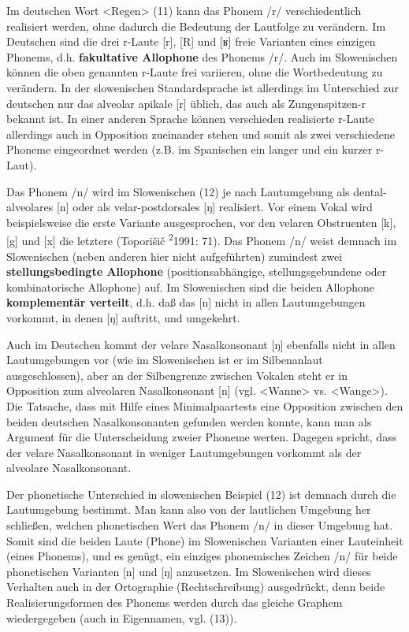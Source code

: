\documentclass[
]{article}
\begin{document}
Im deutschen Wort \textless Regen\textgreater{} (11) kann das Phonem /r/ verschiedentlich
realisiert werden, ohne dadurch die Bedeutung der Lautfolge zu
verändern. Im Deutschen sind die drei r-Laute {[}r{]}, {[}R{]} und {[}ʁ{]} freie
Varianten eines einzigen Phonems, d.h. \textbf{fakultative Allophone} des
Phonems /r/. Auch im Slowenischen können die oben genannten r-Laute frei
variieren, ohne die Wortbedeutung zu verändern. In der slowenischen
Standardsprache ist allerdings im Unterschied zur deutschen nur das
alveolar apikale {[}r{]} üblich, das auch als Zungenspitzen-r bekannt ist.
In einer anderen Sprache können verschieden realisierte r-Laute
allerdings auch in Opposition zueinander stehen und somit als zwei
verschiedene Phoneme eingeordnet werden (z.B. im Spanischen ein langer
und ein kurzer r-Laut).

Das Phonem /n/ wird im Slowenischen (12) je nach Lautumgebung als
dental-alveolares {[}n{]} oder als velar-postdorsales {[}ŋ{]} realisiert. Vor
einem Vokal wird beispielsweise die erste Variante ausgesprochen, vor
den velaren Obstruenten {[}k{]}, {[}g{]} und {[}x{]} die letztere (Toporišič
\textsuperscript{2}1991: 71). Das Phonem /n/ weist demnach im Slowenischen (neben
anderen hier nicht aufgeführten) zumindest zwei \textbf{stellungsbedingte
Allophone} (positionsabhängige, stellungsgebundene oder kombinatorische
Allophone) auf. Im Slowenischen sind die beiden Allophone \textbf{komplementär
verteilt}, d.h. daß das {[}n{]} nicht in allen Lautumgebungen vorkommt, in
denen {[}ŋ{]} auftritt, und umgekehrt.

Auch im Deutschen kommt der velare Nasalkonsonant {[}ŋ{]} ebenfalls nicht in
allen Lautumgebungen vor (wie im Slowenischen ist er im Silbenanlaut
ausgeschlossen), aber an der Silbengrenze zwischen Vokalen steht er in
Opposition zum alveolaren Nasalkonsonant {[}n{]} (vgl. \textless Wanne\textgreater{} vs.
\textless Wange\textgreater). Die Tatsache, dass mit Hilfe eines Minimalpaartests eine
Opposition zwischen den beiden deutschen Nasalkonsonanten gefunden
werden konnte, kann man als Argument für die Unterscheidung zweier
Phoneme werten. Dagegen spricht, dass der velare Nasalkonsonant in
weniger Lautumgebungen vorkommt als der alveolare Nasalkonsonant.

Der phonetische Unterschied in slowenischen Beispiel (12) ist demnach
durch die Lautumgebung bestimmt. Man kann also von der lautlichen
Umgebung her schließen, welchen phonetischen Wert das Phonem /n/ in
dieser Umgebung hat. Somit sind die beiden Laute (Phone) im Slowenischen
Varianten einer Lauteinheit (eines Phonems), und es genügt, ein einziges
phonemisches Zeichen /n/ für beide phonetischen Varianten {[}n{]} und {[}ŋ{]}
anzusetzen. Im Slowenischen wird dieses Verhalten auch in der
Ortographie (Rechtschreibung) ausgedrückt, denn beide
Realisierungsformen des Phonems werden durch das gleiche Graphem
wiedergegeben (auch in Eigennamen, vgl. (13)).
\end{document}
